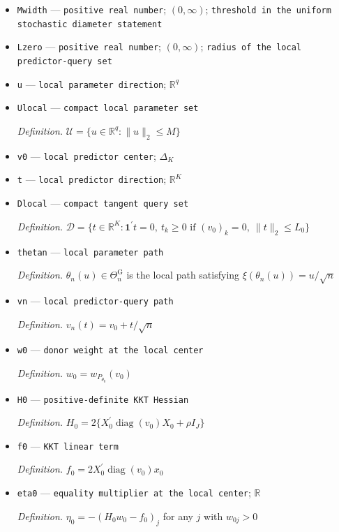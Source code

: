 \documentclass{article}
\begin{document}
\begin{itemize}
  \item \texttt{Mwidth} --- \texttt{positive real number}; \((0,\infty)\); \texttt{threshold in the uniform stochastic diameter statement}
  \item \texttt{Lzero} --- \texttt{positive real number}; \((0,\infty)\); \texttt{radius of the local predictor-\allowbreak{}query set}
  \item \texttt{u} --- \texttt{local parameter direction}; \(\mathbb R^q\)
  \item \texttt{Ulocal} --- \texttt{compact local parameter set}
  \par\smallskip\noindent\emph{Definition.} \(\mathcal U=\{u\in\mathbb R^q:\lVert u\rVert_2\le M\}\)
  \item \texttt{v0} --- \texttt{local predictor center}; \(\Delta_K\)
  \item \texttt{t} --- \texttt{local predictor direction}; \(\mathbb R^K\)
  \item \texttt{Dlocal} --- \texttt{compact tangent query set}
  \par\smallskip\noindent\emph{Definition.} \(\mathcal D=\{t\in\mathbb R^K:\mathbf 1^{\prime}t=0,\ t_k\ge0\text{ if }(v_0)_k=0,\ \lVert t\rVert_2\le L_0\}\)
  \item \texttt{thetan} --- \texttt{local parameter path}
  \par\smallskip\noindent\emph{Definition.} \(\theta_n(u)\in\Theta_n^{\mathrm G}\) is the local path satisfying \(\xi(\theta_n(u))=u/\sqrt n\)
  \item \texttt{vn} --- \texttt{local predictor-\allowbreak{}query path}
  \par\smallskip\noindent\emph{Definition.} \(v_n(t)=v_0+t/\sqrt n\)
  \item \texttt{w0} --- \texttt{donor weight at the local center}
  \par\smallskip\noindent\emph{Definition.} \(w_0=w_{P_{\theta_0}}(v_0)\)
  \item \texttt{H0} --- \texttt{positive-\allowbreak{}definite KKT Hessian}
  \par\smallskip\noindent\emph{Definition.} \(H_0=2\{X_0^{\prime}\operatorname{diag}(v_0)X_0+\rho I_J\}\)
  \item \texttt{f0} --- \texttt{KKT linear term}
  \par\smallskip\noindent\emph{Definition.} \(f_0=2X_0^{\prime}\operatorname{diag}(v_0)x_0\)
  \item \texttt{eta0} --- \texttt{equality multiplier at the local center}; \(\mathbb R\)
  \par\smallskip\noindent\emph{Definition.} \(\eta_0=-(H_0w_0-f_0)_j\) for any \(j\) with \(w_{0j}>0\)

\end{itemize}
\end{document}
